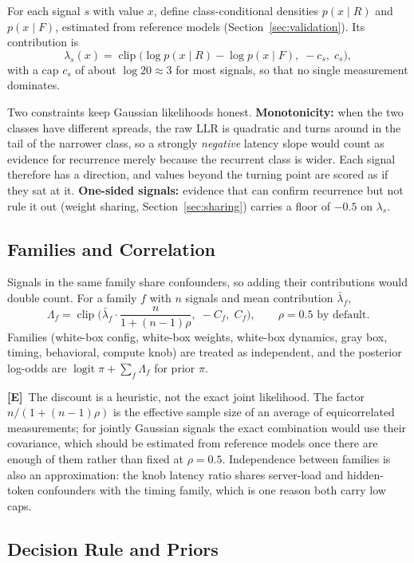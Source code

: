 \documentclass[11pt,letterpaper]{article}
\newcommand{\mE}{\textcolor{deepindigo}{\textbf{[E]}}}
\begin{document}
For each signal $s$ with value $x$, define class-conditional densities $p(x \mid R)$ and $p(x \mid F)$, estimated from reference models (Section~\ref{sec:validation}). Its contribution is
\[
  \lambda_s(x) = \operatorname{clip}\big(\log p(x \mid R) - \log p(x \mid F),\; -c_s,\; c_s\big),
\]
with a cap $c_s$ of about $\log 20 \approx 3$ for most signals, so that no single measurement dominates.

Two constraints keep Gaussian likelihoods honest. \textbf{Monotonicity:} when the two classes have different spreads, the raw LLR is quadratic and turns around in the tail of the narrower class, so a strongly \emph{negative} latency slope would count as evidence for recurrence merely because the recurrent class is wider. Each signal therefore has a direction, and values beyond the turning point are scored as if they sat at it. \textbf{One-sided signals:} evidence that can confirm recurrence but not rule it out (weight sharing, Section~\ref{sec:sharing}) carries a floor of $-0.5$ on $\lambda_s$.

\subsection{Families and Correlation}

Signals in the same family share confounders, so adding their contributions would double count. For a family $f$ with $n$ signals and mean contribution $\bar\lambda_f$,
\[
  \Lambda_f = \operatorname{clip}\Big(\bar\lambda_f \cdot \frac{n}{1+(n-1)\rho},\; -C_f,\; C_f\Big), \qquad \rho = 0.5 \text{ by default}.
\]
Families (white-box config, white-box weights, white-box dynamics, gray box, timing, behavioral, compute knob) are treated as independent, and the posterior log-odds are $\operatorname{logit}\pi + \sum_f \Lambda_f$ for prior $\pi$.

\mE\ The discount is a heuristic, not the exact joint likelihood. The factor $n/(1+(n-1)\rho)$ is the effective sample size of an average of equicorrelated measurements; for jointly Gaussian signals the exact combination would use their covariance, which should be estimated from reference models once there are enough of them rather than fixed at $\rho=0.5$. Independence between families is also an approximation: the knob latency ratio shares server-load and hidden-token confounders with the timing family, which is one reason both carry low caps.

\subsection{Decision Rule and Priors}
\end{document}
